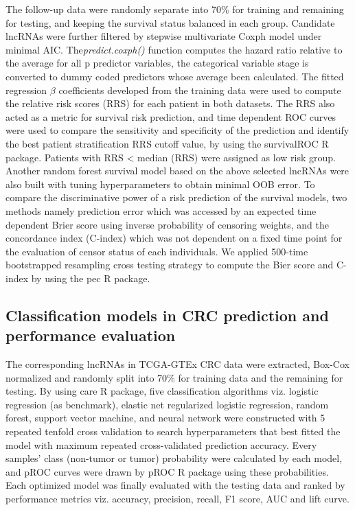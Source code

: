 \documentclass[fleqn,10pt]{wlscirep}
\begin{document}
The follow-up data were randomly separate into 70\% for training and remaining for testing, and keeping the survival status balanced in each group. Candidate lncRNAs were further filtered by stepwise multivariate Coxph model under minimal AIC. The\emph{predict.coxph()} function computes the hazard ratio relative to the average for all p predictor variables, the categorical variable stage is converted to dummy coded predictors whose average been calculated. The fitted regression $\beta$ coefficients developed from the training data were used to compute the relative risk scores (RRS) for each patient in both datasets\cite{RN30}. The RRS also acted as a metric for survival risk prediction, and time dependent ROC curves were used to compare the sensitivity and specificity of the prediction and identify the best patient stratification RRS cutoff value, by using the survivalROC R package\cite{RN31}. Patients with RRS < median (RRS) were assigned as low risk group. Another random forest survival model based on the above selected lncRNAs were also built with tuning hyperparameters to obtain minimal OOB error\cite{RN32}. To compare the discriminative power of a risk prediction of the survival models, two methods namely prediction error which was accessed by an expected time dependent Brier score using inverse probability of censoring weights, and the concordance index (C-index) which was not dependent on a fixed time point for the evaluation of censor status of each individuals. We applied 500-time bootstrapped resampling cross testing strategy to compute the Bier score and C-index by using the pec R package\cite{RN33}.

\subsection*{Classification models in CRC prediction and performance evaluation}
The corresponding  lncRNAs in TCGA-GTEx CRC data were extracted, Box-Cox normalized and randomly split into 70\% for training data and the remaining for testing. By using care R package\cite{RN16},  five classification algorithms viz. logistic regression (as benchmark), elastic net regularized logistic regression, random forest, support vector machine, and neural network were constructed with 5 repeated tenfold cross validation to search hyperparameters that best fitted the model with maximum repeated cross-validated prediction accuracy. Every samples' class (non-tumor or tumor) probability were calculated by each model, and pROC curves were drawn by pROC R package using these probabilities\cite{RN34}. Each optimized model was finally evaluated with the testing data and ranked by performance metrics viz. accuracy, precision, recall, F1 score, AUC and lift curve.
\end{document}
